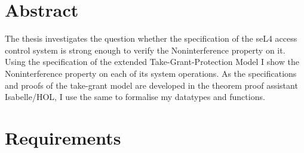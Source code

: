\documentclass[11pt,a4paper,twoside]{article}
\begin{document}
	
\deckblatt
	
	
\declaration
{}

\clearpage
\section*{Abstract}
	
The thesis investigates the question whether the specification of the seL4 access control system is strong enough to verify the Noninterference property on it. 
Using the specification of the extended Take-Grant-Protection Model \cite{TakeG} I show the Noninterference property \cite{InfFlow} on each of its system operations. 
As the specifications and proofs of the take-grant model are developed in the theorem proof assistant Isabelle/HOL, I use the same to formalise my datatypes and functions. 
	

\newpage
\listoffigures
\newpage
\tableofcontents

	
\clearpage

	 
\newpage
\section{Requirements}

\newpage

\clearpage

\newpage
 
\newpage

\newpage

\newpage

\newpage
\end{document}
